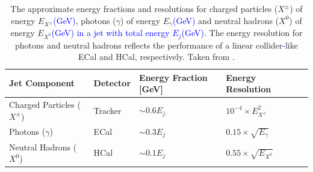 \begin{table}[h!]
\centering
\begin{tabular}{ l l l l l}
\hline
Jet Component & Detector & Energy Fraction [GeV] & Energy Resolution \\
\hline
Charged Particles ($X^{\pm}$) & Tracker & $\sim 0.6 E_{j}$ & $10^{-4} \times E_{X^{\pm}}^{2}$ \\
Photons ($\gamma$) & ECal & $\sim 0.3 E_{j}$ & $0.15 \times \sqrt{E_{\gamma}}$ \\
Neutral Hadrons ($X^{0}$) & HCal &$\sim 0.1 E_{j}$ & $0.55 \times \sqrt{E_{X^{0}}}$ \\
\hline
\end{tabular}
\caption[The approximate energy fractions and resolutions for charged particles ($X^{\pm}$) of energy $E_{X^{\pm}}$\textcolor{blue}{(GeV)}, photons ($\gamma$) of energy $E_{\gamma}$\textcolor{blue}{(GeV)} and neutral hadrons ($X^{0}$) of energy $E_{X^{0}}$\textcolor{blue}{(GeV)} \textcolor{blue}{in a jet with total energy $E_{j}$(GeV)}.  The energy resolution for photons and neutral hadrons reflects the performance of a linear collider\textcolor{blue}{-}like ECal and HCal\textcolor{blue}{,} respectively.  Taken from \cite{arXiv:0907.3577}.]{The approximate energy fractions and resolutions for charged particles ($X^{\pm}$) of energy $E_{X^{\pm}}$\textcolor{blue}{(GeV)}, photons ($\gamma$) of energy $E_{\gamma}$\textcolor{blue}{(GeV)} and neutral hadrons ($X^{0}$) of energy $E_{X^{0}}$\textcolor{blue}{(GeV)} \textcolor{blue}{in a jet with total energy $E_{j}$(GeV)}.  The energy resolution for photons and neutral hadrons reflects the performance of a linear collider\textcolor{blue}{-}like ECal and HCal\textcolor{blue}{,} respectively.  Taken from \cite{arXiv:0907.3577}.}
\label{table:pflowjet}
\end{table}

